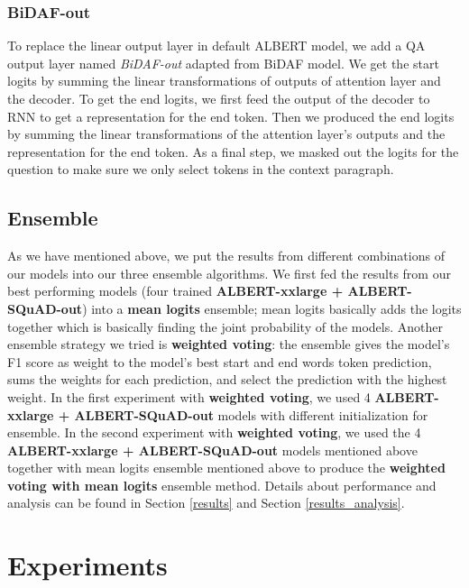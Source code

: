 \documentclass{article}
\begin{document}
\subsubsection{BiDAF-out}
To replace the linear output layer in default ALBERT model, we add a QA output layer named \textit{BiDAF-out} adapted from BiDAF model. We get the start logits by summing the linear transformations of outputs of attention layer and the decoder. To get the end logits, we first feed the output of the decoder to RNN to get a representation for the end token. Then we produced the end logits by summing the linear transformations of the attention layer's outputs and the representation for the end token. As a final step, we masked out the logits for the question to make sure we only select tokens in the context paragraph.

\subsection{Ensemble} \label{ensemble}
As we have mentioned above, we put the results from different combinations of our models into our three ensemble algorithms. We first fed the results from our best performing models (four trained \textbf{ALBERT-xxlarge + ALBERT-SQuAD-out}) into a \textbf{mean logits} ensemble; mean logits basically adds the logits together which is basically finding the joint probability of the models. Another ensemble strategy we tried is \textbf{weighted voting}: the ensemble gives the model's F1 score as weight to the model's best start and end words token prediction, sums the weights for each prediction, and select the prediction with the highest weight. In the first experiment with \textbf{weighted voting}, we used 4 \textbf{ALBERT-xxlarge + ALBERT-SQuAD-out} models with different initialization for ensemble. In the second experiment with \textbf{weighted voting}, we used the 4 \textbf{ALBERT-xxlarge + ALBERT-SQuAD-out} models mentioned above together with mean logits ensemble mentioned above to produce the \textbf{weighted voting with mean logits} ensemble method. Details about performance and analysis can be found in Section \ref{results} and Section \ref{results_analysis}.





\section{Experiments}
\end{document}
